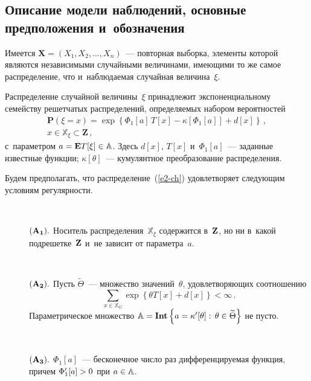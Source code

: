 \begin{multicols}{2}
  \vspace*{-12pt}


\section{Описание модели наблюдений, основные предположения и~обозначения}

\vspace*{-2pt}


   Имеется $\mathbf{X}=\left(X_1,X_2,\ldots,X_n\right)$~--- повторная выборка,
  элементы которой являются независимыми случайными величинами, имеющими то 
  же самое распределение, что и~наблюдаемая случайная величина~$\xi$.

   Распределение случайной величины~$\xi$ принадлежит экспоненциальному семейству
  решетчатых распределений, определяемых набором вероятностей
  \begin{multline}
   \mathbf{P}(\xi=x) =
    \exp \left\{ \Phi_1[a] \, T[x] -\kappa[\Phi_1[a]]+ d[x ]\right\}\,,\\
   x\in {\mathbb X}_\xi\subset \mathbf{Z}\,,
   \label{e2-ch}
  \end{multline}
  с~параметром $a \hm= \mbox {\bf E} T[\xi]\in {\mathbb A}$.
  Здесь $d[x]$,  $T[x]$ и~$\Phi_1[a]$~--- заданные известные функции;
  $\kappa[\theta]$~--- кумулянтное преобразование распределения.

   Будем предполагать, что распределение~(\ref{e2-ch}) удовле\-тво\-ря\-ет следующим условиям
  регулярности.
  \begin{description}
  \item[\,] $\bf (A_1).$
   Носитель распределения~${\mathbb X}_\xi$ содержится в~$\bf Z$, но ни 
   в~какой подрешетке~$\bf Z$ и~не зависит от параметра~$a$.
  \item[\,] $\bf (A_2).$ Пусть $\widetilde{\Theta}$~--- множество 
  значений~$\theta$, удовлетворяющих соотношению
  \begin{equation*}
   \sum\limits_{x\in {\mathbb X}_G} \exp \left\{\theta  T[x]+d[x]\right\}<\infty\,.
  \end{equation*}
   Параметрическое множество ${\mathbb A}\hm= \mathbf{Int} 
   \left\{a=\kappa'[\theta]:\,\theta\in\widetilde{\Theta}\right\}$ не пусто.
  \item[\,] $\bf (A_3).$ $\Phi_1[a]$~--- бесконечное число раз 
  дифференцируемая функция, причем
      $\Phi'_1[a]\hm > 0$ при $a\hm\in {\mathbb A}$.
  \end{description}


\end{multicols}
